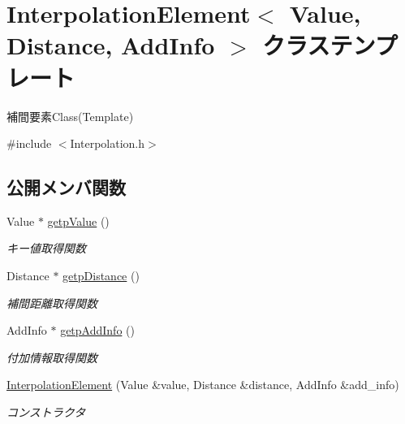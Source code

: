\hypertarget{class_interpolation_element}{}\section{Interpolation\+Element$<$ Value, Distance, Add\+Info $>$ クラステンプレート}
\label{class_interpolation_element}


補間要素\+Class(\+Template)  




{\ttfamily \#include $<$Interpolation.\+h$>$}

\subsection*{公開メンバ関数}
\begin{DoxyCompactItemize}
\item 
Value $\ast$ \mbox{\hyperlink{class_interpolation_element_afd5a4d717599f5bd681eb72365af9b39}{getp\+Value}} ()
\begin{DoxyCompactList}\small\item\em キー値取得関数 \end{DoxyCompactList}\item 
Distance $\ast$ \mbox{\hyperlink{class_interpolation_element_a7f203d40a738a537582e6996c8ee8dda}{getp\+Distance}} ()
\begin{DoxyCompactList}\small\item\em 補間距離取得関数 \end{DoxyCompactList}\item 
Add\+Info $\ast$ \mbox{\hyperlink{class_interpolation_element_ac55b56fb903541d4284f743985dfeaec}{getp\+Add\+Info}} ()
\begin{DoxyCompactList}\small\item\em 付加情報取得関数 \end{DoxyCompactList}\item 
\mbox{\hyperlink{class_interpolation_element_a727cf8064628102adb1b0b61caeaa347}{Interpolation\+Element}} (Value \&value, Distance \&distance, Add\+Info \&add\+\_\+info)
\begin{DoxyCompactList}\small\item\em コンストラクタ \end{DoxyCompactList}\end{DoxyCompactItemize}
